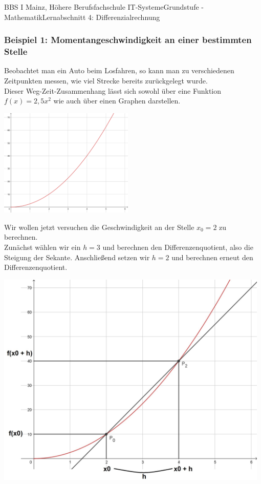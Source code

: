 \documentclass[11pt,twocolumn,oneside,openany,headings=optiontotoc,11pt,numbers=noenddot,final]{article}
\begin{document}
\begin{worksheet}{BBS I Mainz, Höhere Berufsfachschule IT-Systeme}{Grundstufe - Mathematik}{Lernabschnitt 4: Differenzialrechnung}
		\subsubsection*{Beispiel 1: Momentangeschwindigkeit an einer bestimmten Stelle}
		Beobachtet man ein Auto beim Losfahren, so kann man zu verschiedenen Zeitpunkten messen, wie viel Strecke bereits zurückgelegt wurde.\\
		Dieser Weg-Zeit-Zusammenhang lässt sich sowohl über eine Funktion \(f(x) = 2,5x^2\) wie auch über einen Graphen darstellen.\\
		\par\noindent
		\includegraphics[width=0.48\textwidth]{../99_Bilder/04_AutoAnf.png}\\
		\par\noindent
		Wir wollen jetzt versuchen die Geschwindigkeit an der Stelle \(x_0 = 2\) zu berechnen.\\
		Zunächst wählen wir ein \(h = 3\) und berechnen den Differenzenquotient, also die Steigung der Sekante. Anschließend setzen wir \(h = 2\) und berechnen erneut den Differenzenquotient.\\
		\begin{minipage}{0.22\textwidth}
			\includegraphics[width=0.98\textwidth]{../99_Bilder/04_Skr_DiffQuo_2.jpg}

\end{minipage}
\end{worksheet}
\end{document}

